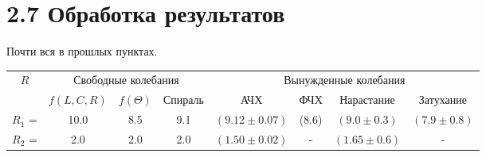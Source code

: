 \documentclass[a4paper,12pt]{extarticle}
\begin{document}
\section*{2.7 Обработка результатов}
Почти вся в прошлых пунктах. \\
\begin{tabular}{|c|ccc|cccc|}
\hline
\multirow{2}{*}{$R$} & \multicolumn{3}{c|}{Свободные колебания}                  & \multicolumn{4}{c|}{Вынужденные колебания}                                                        \\ \cline{2-8} 
                   & \multicolumn{1}{c|}{$f(L,C,R)$} & \multicolumn{1}{c|}{$f(\Theta)$} & Спираль & \multicolumn{1}{c|}{АЧХ} & \multicolumn{1}{c|}{ФЧХ} & \multicolumn{1}{c|}{Нарастание} & Затухание \\ \hline
$R_1$ = & \multicolumn{1}{c|}{10.0}  & \multicolumn{1}{c|}{8.5}  &    9.1     & \multicolumn{1}{c|}{$(9.12\pm0.07)$}    & \multicolumn{1}{c|}{(8.6\pm0.2)}    & \multicolumn{1}{c|}{$(9.0\pm0.3)$}           &     $(7.9\pm0.8)$      \\ \hline
$R_2$ = & \multicolumn{1}{c|}{2.0}  & \multicolumn{1}{c|}{2.0}  &     2.0    & \multicolumn{1}{c|}{$(1.50\pm0.02)$}    & \multicolumn{1}{c|}{-}    & \multicolumn{1}{c|}{$(1.65\pm0.6)$}           &      -     \\ \hline
\end{tabular}
\end{document}

